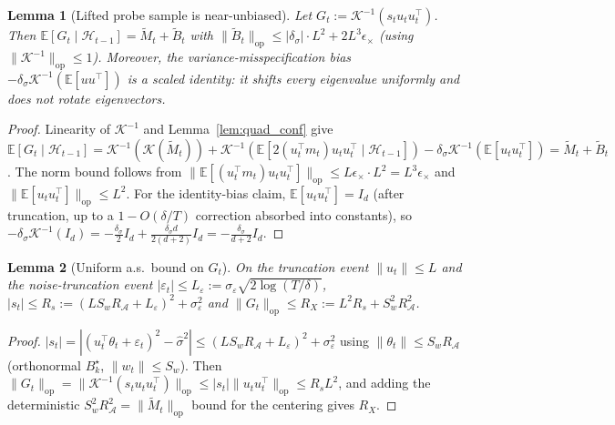 \documentclass{article}
\newcommand{\E}{\mathbb{E}}
\newcommand{\op}{\mathrm{op}}
\newcommand{\cA}{\mathcal{A}}
\newcommand{\cH}{\mathcal{H}}
\newtheorem{lemma}{Lemma}
\begin{document}
\begin{lemma}[Lifted probe sample is near-unbiased]
\label{lem:G_unbiased_conf}
Let $G_t := \mathcal K^{-1}(s_t u_tu_t^\top)$. Then
$\E[G_t\mid\cH_{t-1}] = \widetilde M_t + \widetilde B_t$ with
$\|\widetilde B_t\|_\op \le |\delta_\sigma|\cdot L^2 + 2 L^3\epsilon_\times$
(using $\|\mathcal K^{-1}\|_\op\le 1$). Moreover, the
variance-misspecification bias
$-\delta_\sigma\mathcal K^{-1}(\E[uu^\top])$
is a \emph{scaled identity}: it shifts every eigenvalue uniformly and
does not rotate eigenvectors.
\end{lemma}
\begin{proof}
Linearity of $\mathcal K^{-1}$ and Lemma~\ref{lem:quad_conf} give
$\E[G_t\mid\cH_{t-1}]
= \mathcal K^{-1}(\mathcal K(\widetilde M_t))
+ \mathcal K^{-1}(\E[2(u_t^\top m_t)u_tu_t^\top\mid\cH_{t-1}])
- \delta_\sigma\mathcal K^{-1}(\E[u_tu_t^\top])
= \widetilde M_t + \widetilde B_t$.
The norm bound follows from
$\|\E[(u_t^\top m_t)u_tu_t^\top]\|_\op \le L\epsilon_\times\cdot L^2 = L^3\epsilon_\times$
and $\|\E[u_tu_t^\top]\|_\op \le L^2$. For the identity-bias claim,
$\E[u_tu_t^\top] = I_d$ (after truncation, up to a $1-O(\delta/T)$
correction absorbed into constants), so
$-\delta_\sigma\mathcal K^{-1}(I_d) = -\frac{\delta_\sigma}{2}I_d
+ \frac{\delta_\sigma d}{2(d+2)}I_d = -\frac{\delta_\sigma}{d+2}I_d$.
\end{proof}

\begin{lemma}[Uniform a.s.\ bound on $G_t$]
\label{lem:G_bound_conf}
On the truncation event $\|u_t\|\le L$ and the noise-truncation event
$|\varepsilon_t|\le L_\varepsilon := \sigma_\varepsilon\sqrt{2\log(T/\delta)}$,
$|s_t|\le R_s := (LS_w R_\cA + L_\varepsilon)^2 + \sigma_\varepsilon^2$ and
$\|G_t\|_\op \le R_X := L^2 R_s + S_w^2 R_\cA^2$.
\end{lemma}
\begin{proof}
$|s_t| = |(u_t^\top\theta_t + \varepsilon_t)^2 - \hat\sigma^2|
\le (LS_w R_\cA + L_\varepsilon)^2 + \sigma_\varepsilon^2$ using
$\|\theta_t\|\le S_w R_\cA$ (orthonormal $B_k^\star$, $\|w_t\|\le S_w$).
Then $\|G_t\|_\op = \|\mathcal K^{-1}(s_t u_tu_t^\top)\|_\op
\le |s_t|\|u_tu_t^\top\|_\op \le R_s L^2$, and adding the deterministic
$S_w^2 R_\cA^2 = \|\widetilde M_t\|_\op$ bound for the centering gives
$R_X$.
\end{proof}
\end{document}
